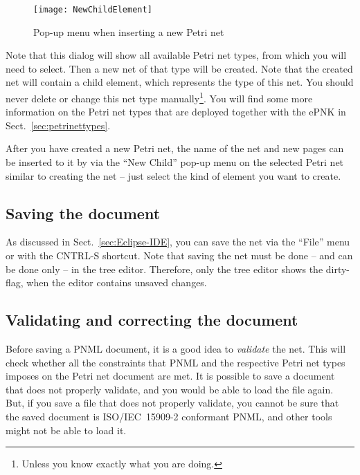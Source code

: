 \begin{figure}[hbt!!]
  \centerline{\texttt{[image: NewChildElement]}}
  \caption{Pop-up menu when inserting a new Petri net}
  \label{fig:new-child-element}
\end{figure}

Note that this dialog will show all available Petri net types, from which
you will need to select. Then a new net of that type will be created. Note
that the created net will contain a child element, which represents
the type of this net. You should never delete or change this net type
manually\footnote
  {Unless you know exactly what you are doing.}.
You will find some more information on the Petri net types that
are deployed together with the ePNK in Sect.~\ref{sec:petrinettypes}. 

After you have created a new Petri net, the name of the net and new
pages can be inserted to it by via the ``New Child'' pop-up menu on the
selected Petri net similar to creating the net -- just select the
kind of element you want to create.

\subsection{Saving the document}
\label{subsec:save-documents}

As discussed in Sect.~\ref{sec:Eclipse-IDE}, you can save the net via the
``File'' menu or with the CNTRL-S shortcut. Note that saving the net
must be done -- and can be done only -- in the tree editor. Therefore,
only the tree editor shows the dirty-flag, when the editor contains
unsaved changes.

\subsection{Validating and correcting the document}
\label{subsec:validation}

Before saving a PNML document, it is a good idea to \emph{validate} the
net. This will check whether all the constraints that PNML and the
respective Petri net types imposes on the Petri net document are met. It is
possible to save a document that does not properly validate, and you would
be able to load the file again. But, if you save a file that
does not properly validate, you cannot be sure that the saved document
is ISO/IEC~15909-2 conformant PNML, and other tools might not be able to load
it.

